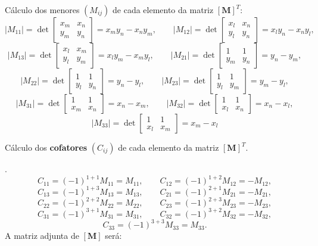 \documentclass[
12pt,
a4paper,
oneside,
chapter=TITLE,
sumario=tradicional
]{abntex2}
\begin{document}
Cálculo dos menores $(M_{ij})$ de cada elemento da matriz $[\mathbf{M}]^T$:
$$
|M_{11}| = \det \begin{bmatrix}
	x_m & x_n \\
	y_m & y_n
\end{bmatrix}
= x_m y_n - x_n y_m,
\qquad
|M_{12}| = \det \begin{bmatrix}
	x_l & x_n \\
	y_l & y_n
\end{bmatrix}
= x_l y_n - x_n y_l,
$$
$$
|M_{13}| = \det \begin{bmatrix}
	x_l & x_m \\
	y_l & y_m
\end{bmatrix}
= x_l y_m - x_m y_l,
\qquad
|M_{21}| = \det \begin{bmatrix}
	1 & 1 \\
	y_m & y_n
\end{bmatrix}
= y_n - y_m,
$$
$$
|M_{22}| = \det \begin{bmatrix}
	1 & 1 \\
	y_l & y_n
\end{bmatrix}
= y_n - y_l,
\qquad
|M_{23}| = \det \begin{bmatrix}
	1 & 1 \\
	y_l & y_m
\end{bmatrix}
= y_m - y_l,
$$
$$
|M_{31}| = \det \begin{bmatrix}
	1 & 1 \\
	x_m & x_n
\end{bmatrix}
= x_n - x_m,
\qquad
|M_{32}| = \det \begin{bmatrix}
	1 & 1 \\
	x_l & x_n
\end{bmatrix}
= x_n - x_l,
$$
$$
|M_{33}| = \det \begin{bmatrix}
	1 & 1 \\
	x_l & x_m
\end{bmatrix}
= x_m - x_l
$$

Cálculo dos \textbf{cofatores} $(C_{ij})$ de cada elemento da matriz $[\mathbf{M}]^T$.

.
$$
C_{11} = (-1)^{1+1} M_{11} = M_{11}, \qquad
C_{12} = (-1)^{1+2} M_{12} = -M_{12},
$$
$$
C_{13} = (-1)^{1+3} M_{13} = M_{13}, \qquad
C_{21} = (-1)^{2+1} M_{21} = -M_{21},
$$
$$
C_{22} = (-1)^{2+2} M_{22} = M_{22}, \qquad
C_{23} = (-1)^{2+3} M_{23} = -M_{23},
$$
$$
C_{31} = (-1)^{3+1} M_{31} = M_{31}, \qquad
C_{32} = (-1)^{3+2} M_{32} = -M_{32},
$$
$$
C_{33} = (-1)^{3+3} M_{33} = M_{33}.
$$
A matriz adjunta de $[\mathbf{M}]$ será:
\end{document}
